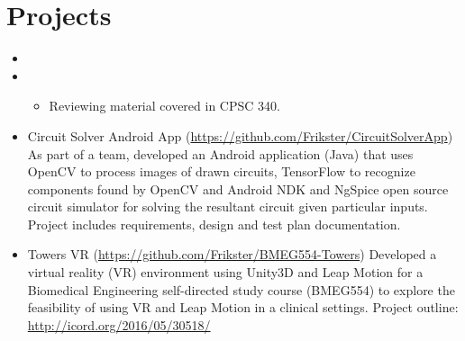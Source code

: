\documentclass[11pt,a4paper,sans]{moderncv}        %
\begin{document}
\section{Projects}
  \begin{itemize} 
  		\item{}
  
        \item{}
      \begin{itemize}
      \item[\raisebox{0.25ex}{\tiny$\bullet$}] Reviewing material covered in CPSC 340.
      \end{itemize}\vspace{3pt}  
  
      \item{Circuit Solver Android App (\href{https://github.com/Frikster/CircuitSolverApp}{https://github.com/Frikster/CircuitSolverApp})}
      {As part of a team, developed an Android application (Java) that uses OpenCV to process images of drawn circuits, TensorFlow to recognize components found by OpenCV and Android NDK and NgSpice open source circuit simulator for solving the resultant circuit given particular inputs. Project includes requirements, design and test plan documentation.}
    \item{Towers VR (\href{https://github.com/Frikster/BMEG554-Towers}{https://github.com/Frikster/BMEG554-Towers})}
      {Developed a virtual reality (VR) environment using Unity3D and Leap Motion for a Biomedical Engineering self-directed study course (BMEG554) to explore the feasibility of using VR and Leap Motion in a clinical settings. Project outline: \href{http://icord.org/2016/05/30518/}{http://icord.org/2016/05/30518/} }
  \end{itemize}



  
  
\end{document}
